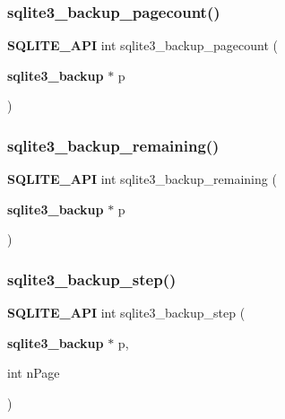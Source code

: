 \mbox{\label{sqlite3_8h_a53d46e1d14e9697eb01b52d0e7160b71}} 
\subsubsection{sqlite3\_backup\_pagecount()}
{\footnotesize\ttfamily \textbf{ S\+Q\+L\+I\+T\+E\+\_\+\+A\+PI} int sqlite3\+\_\+backup\+\_\+pagecount (\begin{DoxyParamCaption}\item[{\textbf{ sqlite3\+\_\+backup} $\ast$}]{p }\end{DoxyParamCaption})}

\mbox{\label{sqlite3_8h_a30619997cb5fbed896c89dab99702cc7}} 
\subsubsection{sqlite3\_backup\_remaining()}
{\footnotesize\ttfamily \textbf{ S\+Q\+L\+I\+T\+E\+\_\+\+A\+PI} int sqlite3\+\_\+backup\+\_\+remaining (\begin{DoxyParamCaption}\item[{\textbf{ sqlite3\+\_\+backup} $\ast$}]{p }\end{DoxyParamCaption})}

\mbox{\label{sqlite3_8h_a1699b75e98d082eebc465a9e64c35269}} 
\subsubsection{sqlite3\_backup\_step()}
{\footnotesize\ttfamily \textbf{ S\+Q\+L\+I\+T\+E\+\_\+\+A\+PI} int sqlite3\+\_\+backup\+\_\+step (\begin{DoxyParamCaption}\item[{\textbf{ sqlite3\+\_\+backup} $\ast$}]{p,  }\item[{int}]{n\+Page }\end{DoxyParamCaption})}

\mbox{\label{sqlite3_8h_a6c41c2b6f82188283a846a98d5367885}} 
